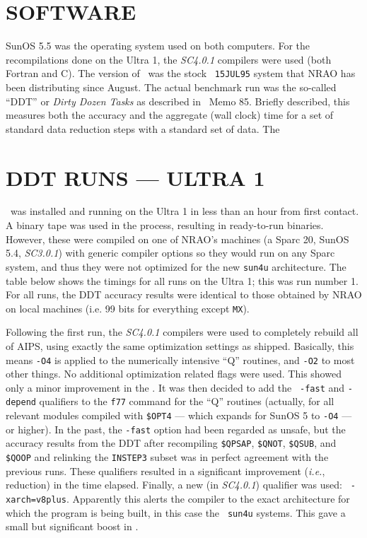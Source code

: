 \section{SOFTWARE}

     SunOS 5.5 was the operating system used on both computers.  For the
recompilations done on the Ultra 1, the {\it SC4.0.1\/} compilers were
used (both Fortran and C).  The version of \AIPS\ was the stock {\tt
15JUL95} system that NRAO has been distributing since August.  The actual
benchmark run was the so-called ``DDT'' or {\it Dirty Dozen Tasks\/} as
described in \AIPS\ Memo 85.  Briefly described, this measures both the
accuracy and the aggregate (wall clock) time for a set of standard data
reduction steps with a standard set of data.  The


\section{DDT RUNS --- ULTRA 1}

     \AIPS\ was installed and running on the Ultra 1 in less than an hour
from first contact.  A binary tape was used in the process, resulting in
ready-to-run binaries.  However, these were compiled on one of NRAO's
machines (a Sparc 20, SunOS 5.4, {\it SC3.0.1}) with generic compiler
options so they would run on any Sparc system, and thus they were not
optimized for the new {\tt sun4u} architecture.  The table below shows the
timings for all runs on the Ultra 1; this was run number 1.  For all runs,
the DDT accuracy results were identical to those obtained by NRAO on local
machines (i.e. 99 bits for everything except {\tt MX}).

     Following the first run, the {\it SC4.0.1\/} compilers were used to
completely rebuild all of AIPS, using exactly the same optimization
settings as shipped.  Basically, this means {\tt -O4} is applied to the
numerically intensive ``Q'' routines, and {\tt -O2} to most other things.
No additional optimization related flags were used.  This showed only a
minor improvement in the \AMark .  It was then decided to add the {\tt
-fast} and {\tt -depend} qualifiers to the {\tt f77} command for the ``Q''
routines (actually, for all relevant modules compiled with {\tt\$OPT4} ---
which expands for SunOS 5 to {\tt -O4} --- or higher).  In the past, the
{\tt -fast} option had been regarded as unsafe, but the accuracy results
from the DDT after recompiling {\tt\$QPSAP}, {\tt\$QNOT}, {\tt\$QSUB}, and
{\tt\$QOOP} and relinking the {\tt INSTEP3} subset was in perfect
agreement with the previous runs.  These qualifiers resulted in a
significant improvement ({\it i.e.\/}, reduction) in the time elapsed.
Finally, a new (in {\it SC4.0.1\/}) qualifier was used: {\tt
-xarch=v8plus}.  Apparently this alerts the compiler to the exact
architecture for which the program is being built, in this case the {\tt
sun4u} systems.  This gave a small but significant boost in \AMark .


